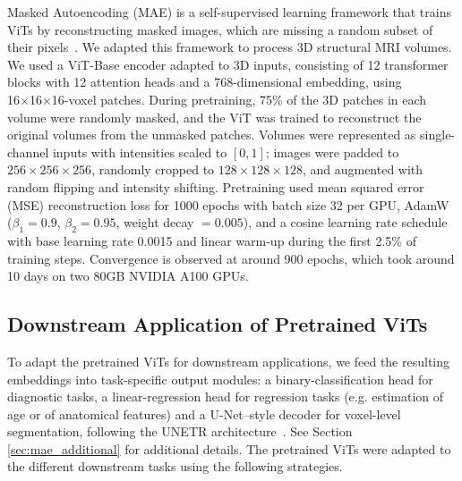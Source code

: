 \documentclass[pdflatex,sn-nature]{sn-jnl}%
\theoremstyle{thmstyleone}%
\theoremstyle{thmstyletwo}%
\theoremstyle{thmstylethree}%
\begin{document}
Masked Autoencoding (MAE) is a self-supervised learning framework that trains ViTs by reconstructing masked images, which are missing a random subset of their pixels~\citep{he2022masked}. We adapted this framework to process 3D structural MRI volumes. We used a ViT-Base encoder adapted to 3D inputs, consisting of 12 transformer blocks with 12 attention heads and a 768-dimensional embedding, using 16×16×16-voxel patches. During pretraining, 75\% of the 3D patches in each volume were randomly masked, and the ViT was trained to reconstruct the original volumes from the unmasked patches. Volumes were represented as single-channel inputs with intensities scaled to $[0,1]$; images were padded to $256 \times 256 \times 256$, randomly cropped to $128 \times 128 \times 128$, and augmented with random flipping and intensity shifting. Pretraining used mean squared error (MSE) reconstruction loss for 1000 epochs with batch size 32 per GPU, AdamW~\citep{loshchilov2017decoupled} ($\beta_1=0.9$, $\beta_2=0.95$, weight decay $=0.005$), and a cosine learning rate schedule~\citep{loshchilov2016sgdr} with base learning rate 0.0015 and linear warm-up during the first 2.5\% of training steps.  Convergence is observed at around 900 epochs, which took around 10 days on two 80GB NVIDIA A100 GPUs.


\subsection*{Downstream Application of Pretrained ViTs}

To adapt the pretrained ViTs for downstream applications, we feed the resulting embeddings into task-specific output modules: a binary-classification head for diagnostic tasks, a linear-regression head for regression tasks (e.g. estimation of age or of anatomical features) and a U-Net–style decoder for voxel-level segmentation, following the UNETR architecture~\citep{hatamizadeh2022unetr}. See Section \ref{sec:mae_additional} for additional details. The pretrained ViTs were adapted to the different downstream tasks using the following strategies. 
\end{document}
